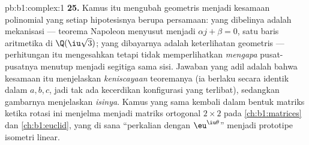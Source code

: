 \begin{solution}{pb:b1:complex:1}
\textbf{25.} Kamus itu mengubah  geometris menjadi
kesamaan polinomial yang setiap hipotesisnya berupa persamaan:
yang dibelinya adalah mekanisasi --- teorema Napoleon menyusut menjadi
$\alpha j + \beta = 0$, satu baris aritmetika di
$\Q(\iu\sqrt3)$; yang dibayarnya adalah keterlihatan geometris ---
perhitungan itu mengesahkan tetapi tidak memperlihatkan \emph{mengapa} pusat-pusatnya
menutup menjadi segitiga sama sisi. Jawaban yang adil adalah bahwa
kesamaan itu menjelaskan \emph{keniscayaan} teoremanya (ia berlaku
secara identik dalam $a, b, c$, jadi tak ada kecerdikan konfigurasi yang
terlibat), sedangkan gambarnya menjelaskan \emph{isinya}. Kamus yang sama
kembali dalam bentuk matriks ketika rotasi ini menjelma menjadi
matriks ortogonal $2 \times 2$ pada \cref{ch:b1:matrices} dan
\cref{ch:b1:euclid}, yang di sana ``perkalian dengan
$\eu^{\iu\theta}$'' menjadi prototipe isometri linear.

\end{solution}
